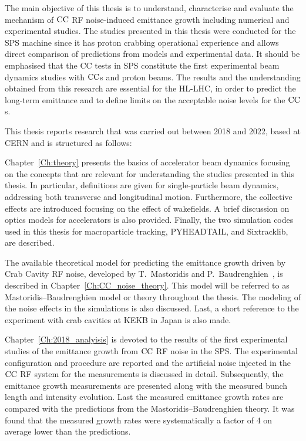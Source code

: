 The main objective of this thesis is to understand, characterise and evaluate the mechanism of ${\mathrm{CC}}$ RF noise-induced emittance growth including numerical and experimental studies. The studies presented in this thesis were conducted for the SPS machine since it has proton crabbing operational experience and allows direct comparison of predictions from models and experimental data. It should be emphasised that the CC tests in SPS constitute the first experimental beam dynamics studies with ${\mathrm{CC}}$s and proton beams. The results and the understanding obtained from this research are essential for the HL-LHC, in order to predict the long-term emittance and to define limits on the acceptable noise levels for the ${\mathrm{CC}}$s.

This thesis reports research that was carried out between 2018 and 2022, based at CERN and is structured as follows:

Chapter~\ref{Ch:theory} presents the basics of accelerator beam dynamics focusing on the concepts that are relevant for understanding the studies presented in this thesis. In particular, definitions are given for single-particle beam dynamics, addressing both transverse and longitudinal motion. Furthermore, the collective effects are introduced focusing on the effect of wakefields. A brief discussion on optics models for accelerators is also provided. Finally, the two simulation codes used in this thesis for macroparticle tracking, PYHEADTAIL, and Sixtracklib, are described.

The available theoretical model for predicting the emittance growth driven by Crab Cavity RF noise, developed by T.~Mastoridis and P.~Baudrenghien~\cite{PhysRevSTAB.18.101001}, is described in Chapter~\ref{Ch:CC_noise_theory}. This model will be referred to as Mastoridis--Baudrenghien model or theory throughout the thesis. The modeling of the noise effects in the simulations is also discussed. Last, a short reference to the experiment with crab cavities at KEKB in Japan is also made. 

Chapter~\ref{Ch:2018_analyisis} is devoted to the results of the first experimental studies of the emittance growth from ${\mathrm{CC}}$ RF noise in the SPS. The experimental configuration and procedure are reported and the artificial noise injected in the ${\mathrm{CC}}$ RF system for the measurements is discussed in detail. Subsequently, the emittance growth measurements are presented along with the measured bunch length and intensity evolution. Last the measured emittance growth rates are compared with the predictions from the Mastoridis--Baudrenghien theory. It was found that the measured growth rates were systematically a factor of 4 on average lower than the predictions. 

